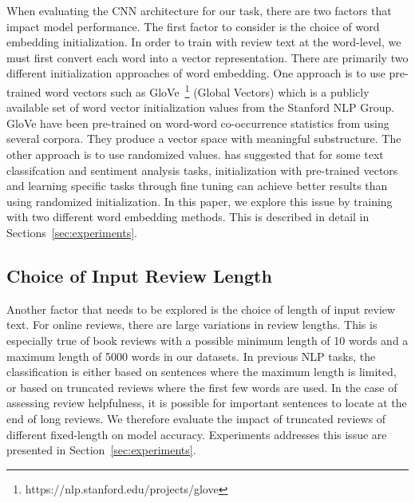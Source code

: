 \documentclass[conference,compsoc]{IEEEtran}
\begin{document}
When evaluating the CNN architecture for our task, there are two factors that impact model performance. The first factor to consider is the choice of word embedding initialization. In order to train with review text at the word-level, we must first convert each word into a vector representation. There are primarily two different initialization approaches of word embedding. One approach is to use pre-trained word vectors such as GloVe~\footnote{https://nlp.stanford.edu/projects/glove} (Global Vectors) which is a publicly available set of word vector initialization values from the Stanford NLP Group. GloVe have been pre-trained on word-word co-occurrence statistics from using several corpora. They produce a vector space with meaningful substructure. The other approach is to use randomized values. \cite{Kim14f} has suggested that for some text classifcation and sentiment analysis tasks, initialization with pre-trained vectors and learning specific tasks through fine tuning can achieve better results than using randomized initialization. In this paper, we explore this issue by training with two different word embedding methods. This is described in detail in Sections~\ref{sec:experiments}.

\subsection{Choice of Input Review Length}
Another factor that needs to be explored is the choice of length of input review text. For online reviews, there are large variations in review lengths. This is especially true of book reviews with a possible minimum length of 10 words and a maximum length of 5000 words in our datasets. In previous NLP tasks, the classification is either based on sentences where the maximum length is limited, or based on truncated reviews where the first few words are used. In the case of assessing review helpfulness, it is possible for important sentences to locate at the end of long reviews. We therefore evaluate the impact of truncated reviews of different fixed-length on model accuracy. Experiments addresses this issue are presented in Section~\ref{sec:experiments}.
\end{document}
